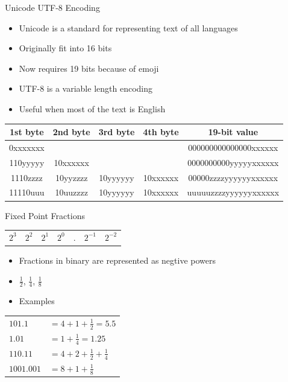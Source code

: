 \begin{withoutheadline}
\begin{frame}[fragile]{Unicode UTF-8 Encoding}
\begin{itemize}
    \item Unicode is a standard for representing text of all languages
    \item Originally fit into 16 bits
    \item Now requires 19 bits because of emoji
    \item UTF-8 is a variable length encoding
    \item Useful when most of the text is English
\end{itemize}
\setlength{\tabcolsep}{2pt}
\scriptsize
\ttfamily
\begin{tabular}{c|c|c|c|c} \toprule
1st byte & 2nd byte & 3rd byte & 4th byte & 19-bit value          \\ \midrule
0xxxxxxx &          &          &          & 000000000000000xxxxxx \\
110yyyyy & 10xxxxxx &          &          & 0000000000yyyyyxxxxxx \\
1110zzzz & 10yyzzzz & 10yyyyyy & 10xxxxxx & 00000zzzzyyyyyyxxxxxx \\
11110uuu & 10uuzzzz & 10yyyyyy & 10xxxxxx & uuuuuzzzzyyyyyyxxxxxx \\ \bottomrule
\end{tabular}
\end{frame}

\begin{frame}[fragile]{Fixed Point Fractions}
\begin{tabular}{c|c|c|c|c|c|c}
$2^3$ & $2^2$ & $2^1$ & $2^0$ & . & $2^{-1}$ & $2^{-2}$ \\       
\end{tabular}

\begin{itemize}
    \item Fractions in binary are represented as negtive powers
    \item $\frac{1}{2}$, $\frac{1}{4}$, $\frac{1}{8}$
    \item Examples
\end{itemize}     
\setlength{\tabcolsep}{2pt}
\ttfamily
\begin{tabular}{p{2cm}p{10cm}}
$101.1$    & $= 4 + 1 + \frac{1}{2} = 5.5$ \\
$1.01$     & $= 1 + \frac{1}{4} = 1.25$    \\
$110.11$   & $= 4 + 2 + \frac{1}{2} + \frac{1}{4}$ \\
$1001.001$ & $= 8 + 1 + \frac{1}{8}$ \\       
\end{tabular}
\end{frame}


\end{withoutheadline}
